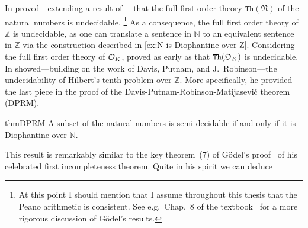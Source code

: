 In \citeyear{Rosser1936} \textcite{Rosser1936} proved---extending a result of
\textcite{Goedel1931}---that the full first order theory
\(\mathtt{Th}(\mathfrak{N})\) of the natural numbers is undecidable.%
\footnote{At this point I should mention that I assume throughout this thesis
that the Peano arithmetic is consistent. See e.g.\ Chap.~8 of the
textbook~\cite{Cooper2004} for a more rigorous discussion of Gödel's results.}
As a consequence, the full first order theory of \(ℤ\) is undecidable, as one
can translate a sentence in \(ℕ\) to an equivalent sentence in \(ℤ\) via the
construction described in \cref{ex:N is Diophantine over Z}. Considering the
full first order theory of \(\mathcal{O}_{K}\), \textcite{Robinson1959} proved as early
as \citeyear{Robinson1959} that \(\mathtt{Th}(\mathfrak{O}_{K})\) is undecidable. In
\citeyear{Matijasevic1970} \textcite{Matijasevic1970} showed---building on the
work of Davis, Putnam, and J.~Robinson---the undecidability of Hilbert's tenth
problem over \(ℤ\). More specifically, he provided the last piece in the proof
of the Davis-Putnam-Robinson-Matijasevič theorem (\textsc{DPRM}).

\begin{restatable}{thm}{DPRM}\label{thm:DPRM}
  A subset of the natural numbers is semi-decidable if and only if it is
  Diophantine over \(ℕ\).
\end{restatable}

This result is remarkably similar to the key theorem~(7) of Gödel's
proof~\cite{Goedel1931} of his celebrated first incompleteness theorem. Quite in
his spirit \cite[cf.][Thm.~9]{Goedel1931} we can deduce

